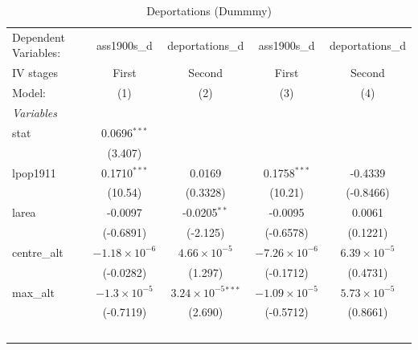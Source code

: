 
\begin{table}[htbp]
   \caption{Deportations (Dummmy)}
   \centering
   \begin{tabular}{lcccc}
      \tabularnewline \midrule \midrule
      Dependent Variables:             & ass1900s\_d            & deportations\_d               & ass1900s\_d            & deportations\_d\\   
      IV stages                        & First                  & Second                        & First                  & Second \\   
      Model:                           & (1)                    & (2)                           & (3)                    & (4)\\  
      \midrule
      \emph{Variables}\\
      stat                             & 0.0696$^{***}$         &                               &                        &   \\   
                                       & (3.407)                &                               &                        &   \\   
      lpop1911                         & 0.1710$^{***}$         & 0.0169                        & 0.1758$^{***}$         & -0.4339\\   
                                       & (10.54)                & (0.3328)                      & (10.21)                & (-0.8466)\\   
      larea                            & -0.0097                & -0.0205$^{**}$                & -0.0095                & 0.0061\\   
                                       & (-0.6891)              & (-2.125)                      & (-0.6578)              & (0.1221)\\   
      centre\_alt                      & $-1.18\times 10^{-6}$  & $4.66\times 10^{-5}$          & $-7.26\times 10^{-6}$  & $6.39\times 10^{-5}$\\    
                                       & (-0.0282)              & (1.297)                       & (-0.1712)              & (0.4731)\\   
      max\_alt                         & $-1.3\times 10^{-5}$   & $3.24\times 10^{-5}$$^{***}$  & $-1.09\times 10^{-5}$  & $5.73\times 10^{-5}$\\    
                                       & (-0.7119)              & (2.690)                       & (-0.5712)              & (0.8661)\\   
$$
\end{tabular}
\end{table}

